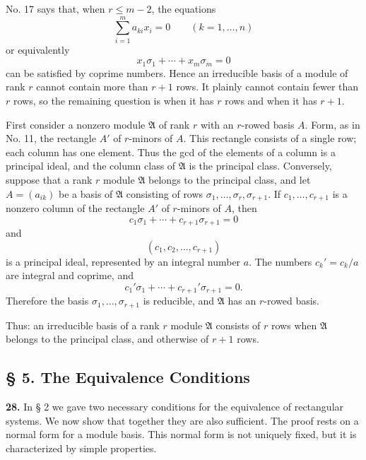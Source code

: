 \documentclass[11pt,a4paper]{article}
\begin{document}
No. 17 says that, when \(r\le m-2\), the equations
\[
 \sum_{i=1}^{m}a_{ki}x_i=0\qquad(k=1,\ldots,n)
\]
or equivalently
\[
 x_1\sigma_1+\cdots+x_m\sigma_m=0
\]
can be satisfied by coprime numbers. Hence an irreducible basis of a module of rank \(r\) cannot contain more than \(r+1\) rows. It plainly cannot contain fewer than \(r\) rows, so the remaining question is when it has \(r\) rows and when it has \(r+1\).

First consider a nonzero module \(\mathfrak A\) of rank \(r\) with an \(r\)-rowed basis \(A\). Form, as in No. 11, the rectangle \(A'\) of \(r\)-minors of \(A\). This rectangle consists of a single row; each column has one element. Thus the gcd of the elements of a column is a principal ideal, and the column class of \(\mathfrak A\) is the principal class. Conversely, suppose that a rank \(r\) module \(\mathfrak A\) belongs to the principal class, and let \(A=(a_{ik})\) be a basis of \(\mathfrak A\) consisting of rows \(\sigma_1,\ldots,\sigma_r,\sigma_{r+1}\). If \(c_1,\ldots,c_{r+1}\) is a nonzero column of the rectangle \(A'\) of \(r\)-minors of \(A\), then
\[
 c_1\sigma_1+\cdots+c_{r+1}\sigma_{r+1}=0 \tag{29}
\]
and
\[
 (c_1,c_2,\ldots,c_{r+1}) \tag{30}
\]
is a principal ideal, represented by an integral number \(a\). The numbers \(c_k'=c_k/a\) are integral and coprime, and
\[
 c_1'\sigma_1+\cdots+c_{r+1}'\sigma_{r+1}=0.
\]
Therefore the basis \(\sigma_1,\ldots,\sigma_{r+1}\) is reducible, and \(\mathfrak A\) has an \(r\)-rowed basis.

Thus: an irreducible basis of a rank \(r\) module \(\mathfrak A\) consists of \(r\) rows when \(\mathfrak A\) belongs to the principal class, and otherwise of \(r+1\) rows.

\subsection*{§ 5. The Equivalence Conditions}

\textbf{28.} In § 2 we gave two necessary conditions for the equivalence of rectangular systems. We now show that together they are also sufficient. The proof rests on a normal form for a module basis. This normal form is not uniquely fixed, but it is characterized by simple properties.
\end{document}
